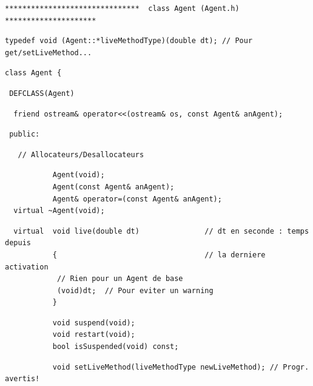 \documentclass[12pt]{article}
\begin{document}
\begin{footnotesize}
\begin{verbatim}
\end{verbatim}
\newpage
\begin{verbatim}
*******************************  class Agent (Agent.h) *********************
\end{verbatim}
\vspace{-0.5cm}
\begin{verbatim}
typedef void (Agent::*liveMethodType)(double dt); // Pour get/setLiveMethod...
\end{verbatim}
\vspace{-0.5cm}
\begin{verbatim}
class Agent {
\end{verbatim}
\vspace{-0.5cm}
\begin{verbatim}
 DEFCLASS(Agent)
\end{verbatim}
\vspace{-0.5cm}
\begin{verbatim}
  friend ostream& operator<<(ostream& os, const Agent& anAgent);
\end{verbatim}
\begin{verbatim}
 public:
\end{verbatim}
\vspace{-0.5cm}
\begin{verbatim}
   // Allocateurs/Desallocateurs
\end{verbatim}
\vspace{-0.5cm}
\begin{verbatim}
           Agent(void);
           Agent(const Agent& anAgent);
           Agent& operator=(const Agent& anAgent);
  virtual ~Agent(void);
\end{verbatim}
\vspace{-0.5cm}
\begin{verbatim}
  virtual  void live(double dt)               // dt en seconde : temps depuis
           {                                  // la derniere activation
            // Rien pour un Agent de base
            (void)dt;  // Pour eviter un warning
           }
\end{verbatim}
\vspace{-0.5cm}
\begin{verbatim}
           void suspend(void);
           void restart(void);
           bool isSuspended(void) const;
\end{verbatim}
\vspace{-0.5cm}
\begin{verbatim}
           void setLiveMethod(liveMethodType newLiveMethod); // Progr. avertis!

\end{verbatim}
\end{footnotesize}
\end{document}
